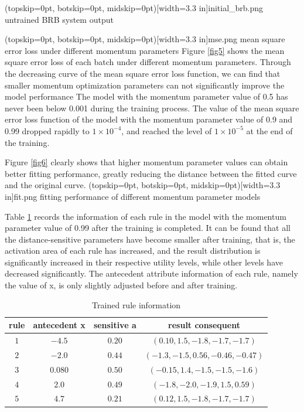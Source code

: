 \documentclass{ieeeaccess}
\begin{document}
\Figure[!t](topskip=0pt, botskip=0pt, midskip=0pt)[width=3.3 in]{initial_brb.png}
{untrained BRB system output\label{fig4}}

\Figure[!t](topskip=0pt, botskip=0pt, midskip=0pt)[width=3.3 in]{mse.png}
{mean square error loss under different momentum parameters\label{fig5}}
Figure \ref{fig5} shows the mean square error loss of each batch under different momentum parameters.
Through the decreasing curve of the mean square error loss function,
we can find that smaller momentum optimization parameters can not significantly improve the model performance
The model with the momentum parameter value of 0.5 has never been below 0.001 during the training process.
The value of the mean square error loss function of the model with the momentum parameter value of 0.9 and 0.99 dropped rapidly to $1\times10^{-4}$,
and reached the level of $1\times10^{-5}$ at the end of the training.

Figure \ref{fig6} clearly shows that higher momentum parameter values can obtain better fitting performance,
greatly reducing the distance between the fitted curve and the original curve.
\Figure[!t](topskip=0pt, botskip=0pt, midskip=0pt)[width=3.3 in]{fit.png}
{fitting performance of different momentum parameter models\label{fig6}}

Table \ref{tab2} records the information of each rule in the model with the momentum parameter value of 0.99 after the training is completed.
It can be found that all the distance-sensitive parameters have become smaller after training, that is, the activation area of each rule has increased,
and the result distribution is significantly increased in their respective utility levels, while other levels have decreased significantly.
The antecedent attribute information of each rule, namely the value of x, is only slightly adjusted before and after training.

\begin{table}
    \caption{Trained rule information}
    \centering
    \label{tab2}
    \begin{tabular}{cccc}
        \hline
        rule & antecedent x & sensitive a & result consequent                       \\
        \hline
        $1$  & $-4.5$       & $0.20$      & $(0.10, 1.5, -1.8, -1.7, -1.7)$         \\
        $2$  & $-2.0$       & $0.44$      & $(-1.3 , -1.5 ,  0.56  , -0.46, -0.47)$ \\
        $3$  & $0.080$      & $0.50$      & $(-0.15,  1.4 , -1.5 , -1.5 , -1.6   )$ \\
        $4$  & $2.0$        & $0.49$      & $(-1.8 , -2.0 , -1.9 ,  1.5 ,  0.59)$   \\
        $5$  & $4.7$        & $0.21$      & $(0.12,  1.5 , -1.8 , -1.7, -1.7)$      \\
        \hline
    \end{tabular}
\end{table}
\end{document}
